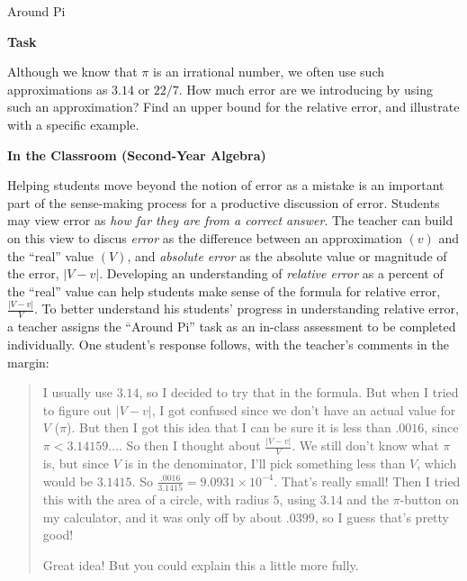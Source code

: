 \TriExample
  {Around Pi}
  {
    \textbf{Task}

    Although we know that $\pi$ is an irrational number, we often use such approximations as $3.14$ or $22/7$. How much error are we introducing by using such an approximation? Find an upper bound for the relative error, and illustrate with a specific example.

    \textbf{In the Classroom (Second-Year Algebra)}

    Helping students move beyond the notion of error as a mistake is an important part of the sense-making process for a productive discussion of error. Students may view error as \emph{how far they are from a correct answer}. The teacher can build on this view to discus \emph{error} as the difference between an approximation $(v)$ and the ``real'' value $(V)$, and \emph{absolute error} as the absolute value or magnitude of the error, $\lvert V - v\rvert$. Developing an understanding of \emph{relative error} as a percent of the ``real'' value can help students make sense of the formula for relative error, $\frac{\lvert V-v\rvert}{V}$. To better understand his students' progress in understanding relative error, a teacher assigns the ``Around Pi'' task as an in-class assessment to be completed individually. One student's response follows, with the teacher's comments in the margin:\vspace{.5\baselineskip}

    \begin{quotation}
      I usually use $3.14$, so I decided to try that in the formula. But when I tried to figure out $\lvert V-v\rvert$, I got confused since we don't have an actual value for $V$ ($\pi$). But then I got this idea that I can be sure it is less than $.0016$, since $\pi<3.14159\dots$. So then I thought about $\frac{\lvert V-v\rvert}{V}$. We still don't know what $\pi$ is, but since $V$ is in the denominator, I'll pick something less than $V$, which would be $3.1415$. So $\frac{.0016}{3.1415}=9.0931\times 10^{-4}$. That's really small! Then I tried this with the area of a circle, with radius $5$, using $3.14$ and the $\pi$-button on my calculator, and it was only off by about $.0399$, so I guess that's pretty good!
      
      \begin{scriptlist}
        \item[Teacher:] Great idea! But you could explain this a little more fully.\vspace{\baselineskip}
        

\end{scriptlist}
\end{quotation}}
